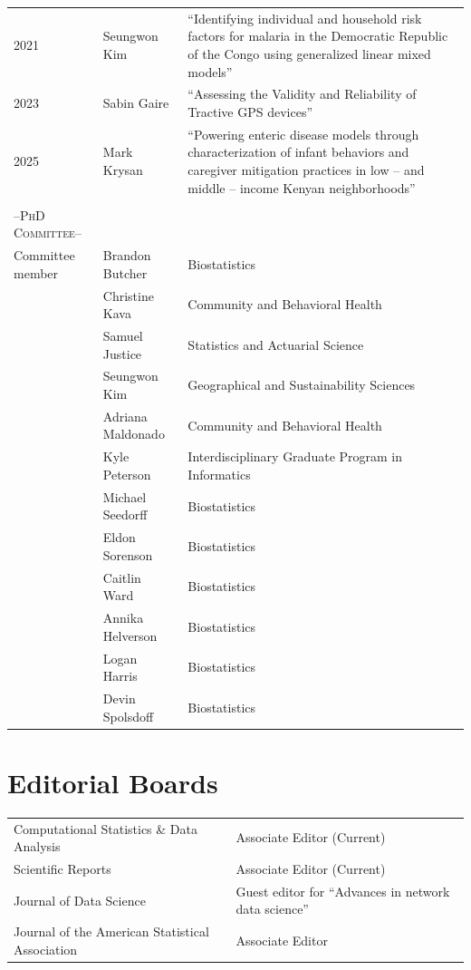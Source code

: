 \documentclass[11pt]{article}
\newcommand{\grayline}{\arrayrulecolor{gray!50} \hline \arrayrulecolor{black}}
\begin{document}
\begin{longtable}{p{}|p{}p{}}
2021 & Seungwon Kim & ``Identifying individual and household risk factors for malaria in the Democratic Republic of the Congo  using generalized linear mixed models'' \\
2023 & Sabin Gaire & ``Assessing the Validity and Reliability of Tractive GPS devices'' \\
2025 & Mark Krysan & ``Powering enteric disease models through characterization of infant behaviors and caregiver mitigation practices in low – and middle – income Kenyan neighborhoods'' \\
\multicolumn{3}{c}{} \\
\multicolumn{1}{l}{\large--\textsc{PhD Committee}--\normalsize} &   & \\
\grayline
Committee member  & Brandon Butcher & Biostatistics \\
 & Christine Kava & Community and Behavioral Health \\
 & Samuel Justice & Statistics and Actuarial Science \\
& Seungwon Kim & Geographical and Sustainability Sciences \\
& Adriana Maldonado & Community and Behavioral Health \\
& Kyle Peterson & Interdisciplinary Graduate Program in Informatics \\
& Michael Seedorff & Biostatistics \\
& Eldon Sorenson & Biostatistics \\
& Caitlin Ward & Biostatistics \\
& Annika Helverson & Biostatistics \\
& Logan Harris & Biostatistics \\
& Devin Spolsdoff & Biostatistics \\
\end{longtable}




\vspace{1pc}
\section{Editorial Boards}
\begin{tabular}{ll}
Computational Statistics \& Data Analysis & Associate Editor (Current) \\
Scientific Reports & Associate Editor (Current) \\
Journal of Data Science & Guest editor for ``Advances in network data science''  \\
Journal of the American Statistical Association & Associate Editor \\
\end{tabular}
\end{document}
